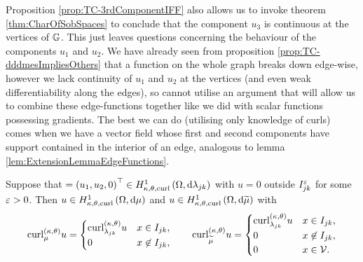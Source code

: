 Proposition \ref{prop:TC-3rdComponentIFF} also allows us to invoke theorem \ref{thm:CharOfSobSpaces} to conclude that the component $u_3$ is continuous at the vertices of $\mathbb{G}$.
This just leaves questions concerning the behaviour of the components $u_1$ and $u_2$.
We have already seen from proposition \ref{prop:TC-dddmesImpliesOthers} that a function on the whole graph breaks down edge-wise, however we lack continuity of $u_1$ and $u_2$ at the vertices (and even weak differentiability along the edges), so cannot utilise an argument that will allow us to combine these edge-functions together like we did with scalar functions possessing gradients.
The best we can do (utilising only knowledge of curls) comes when we have a vector field whose first and second components have support contained in the interior of an edge, analogous to lemma \ref{lem:ExtensionLemmaEdgeFunctions}.
\begin{prop}
	Suppose that $=\left( u_1,u_2,0 \right)^\top\in H^1_{\kappa,\theta,\mathrm{curl}}\left( \Omega, \mathrm{d}\lambda_{jk} \right)$ with $u=0$ outside $I_{jk}^\varepsilon$ for some $\varepsilon>0$.
	Then $u\in H^1_{\kappa,\theta,\mathrm{curl}}\left( \Omega, \mathrm{d}\mu \right)$ and $u\in H^1_{\kappa,\theta,\mathrm{curl}}\left( \Omega, \mathrm{d}\widetilde{\mu} \right)$ with
	\begin{align*}
		\mathrm{curl}_{\mu}^{\left( \kappa, \theta \right)}u =
		\begin{cases} 
			\mathrm{curl}_{\lambda_{jk}}^{\left( \kappa, \theta \right)}u & x\in I_{jk}, \\
			0 & x\not\in I_{jk}, 
		\end{cases}
		\qquad
		\mathrm{curl}_{\widetilde{\mu}}^{\left( \kappa, \theta \right)}u = 
		\begin{cases} 
			\mathrm{curl}_{\lambda_{jk}}^{\left( \kappa, \theta \right)}u & x\in I_{jk}, \\
			0 & x\not\in I_{jk}, \\
			0 & x\in\mathcal{V}.
		\end{cases}
	\end{align*}
\end{prop}
